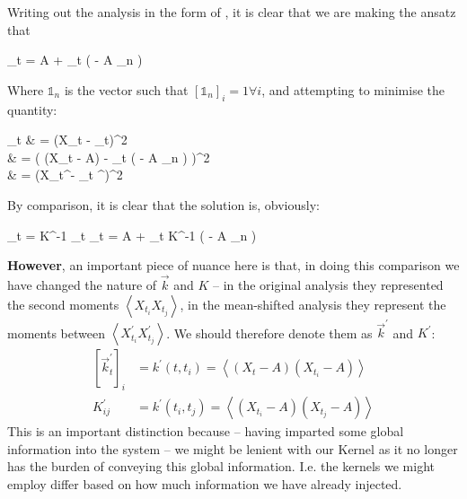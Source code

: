 \documentclass{article}
\def\llangle{\left\langle}
\def\rrangle{\right\rangle}
\newcommand\E[1]{\llangle #1 \rrangle}
\begin{document}
			Writing out the analysis in the form of , it is clear that we are making the ansatz that
			\begin{spalign}
				_t = A + _t \cdot \left(  - A _n \right)
			\end{spalign}
			Where $\mathds{1}_n$ is the vector such that $[\mathds{1}_n]_i = 1 \forall i$, and attempting to minimise the quantity:
			\begin{spalign}
				_t & = \langle (X_t - _t)^2 \rangle
				\\
				& = \llangle \left( (X_t - A) - _t \cdot \left(  - A _n \right) \right)^2 \rrangle
				\\
				& = \llangle \left(X_t^\prime - _t \cdot {}^\prime\right)^2 \rrangle \label{E:ShiftedLocal}
			\end{spalign}
			By comparison, it is clear that the solution is, obviously:
			\begin{spalign}
				_t = K^{-1} _t \LLR {}_t = A + _t \cdot K^{-1} \left(  - A \mathds{1}_n \right)
			\end{spalign}
			\textbf{However}, an important piece of nuance here is that, in doing this comparison we have changed the nature of $\vec{k}$ and $K$ -- in the original analysis they represented the second moments $\llangle X_{t_i} X_{t_j}\rrangle$, in the mean-shifted analysis they represent the moments between $\llangle X_{t_i}^\prime X_{t_j}^\prime \rrangle$. We should therefore denote them as $\vec{k}^\prime$ and $K^\prime$:
			\begin{align}
				\left[\vec{k}^\prime_t \right]_i & = k^\prime(t,t_i) = \E{(X_t-A) (X_{t_i}-A)}
				\\
				K^\prime_{ij} & = k^\prime(t_i, t_j) = \E{(X_{t_i}-A) (X_{t_j}-A)}
			\end{align}
			This is an important distinction because -- having imparted some global information into the system -- we might be lenient with our Kernel as it no longer has the burden of conveying this global information. I.e. the kernels we might employ differ based on how much information we have already injected. 
\end{document}
